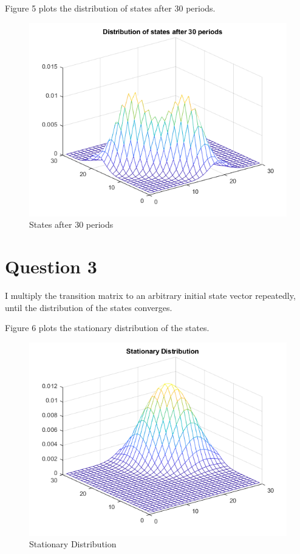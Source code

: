 \documentclass[12pt]{article}
\begin{document}
\clearpage
Figure 5 plots the distribution of states after 30 periods.
\begin{figure}[h]
\includegraphics[width=\textwidth]{5.png}
\caption{States after 30 periods}
\end{figure}
\clearpage
\section*{Question 3}
I multiply the transition matrix to an arbitrary initial state vector repeatedly, until the distribution of the states converges.\par
Figure 6 plots the stationary distribution of the states.
\begin{figure}[h]
\includegraphics[width=\textwidth]{6.png}
\caption{Stationary Distribution}
\end{figure}
\end{document}
